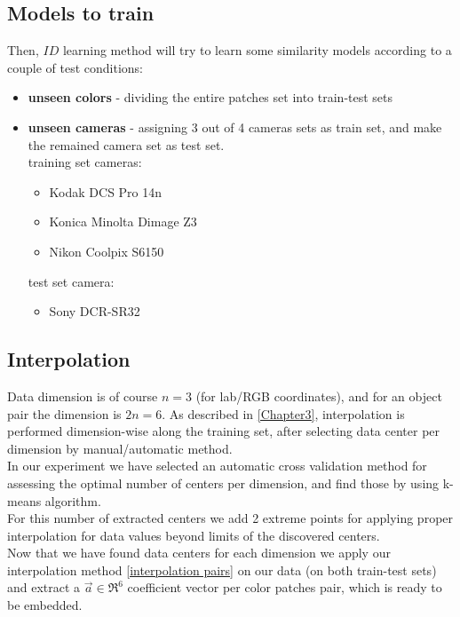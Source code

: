 \subsection{Models to train}
Then, $ID$ learning method will try to learn some similarity models according to a couple of test conditions:

\begin{itemize}
	\item \textbf{unseen colors} - dividing the entire patches set into train-test sets
	\item \textbf{unseen cameras} - assigning 3 out of 4 cameras sets as train set, and make the remained camera set as test set. \\
		training set cameras:
		\begin{itemize}
			\item Kodak DCS	Pro 14n
			\item Konica Minolta Dimage Z3
			\item Nikon Coolpix S6150
		\end{itemize}	
		
		test set camera:	
		\begin{itemize}
			\item Sony DCR-SR32
		\end{itemize}
		
\end{itemize}

\subsection{Interpolation}
Data dimension is of course $n=3$ (for lab/RGB \cite{RGB} coordinates), and for an object pair the dimension is $2n=6$.
As described in \ref{Chapter3}, interpolation is performed dimension-wise along the training set, after selecting data center per dimension by manual/automatic method.
\\
In our experiment we have selected an automatic cross validation \cite{cross validation} method for assessing the optimal number of centers per dimension, and find those by using k-means \cite{kmeans} algorithm.
\\
For this number of extracted centers we add 2 extreme points for applying proper interpolation for data values beyond limits of the discovered centers.
\\
Now that we have found data centers for each dimension we apply our interpolation method \ref{interpolation pairs} on our data (on both train-test sets) and extract a $\overrightarrow{a} \in \Re^6$ coefficient vector per color patches pair, which is ready to be embedded.


